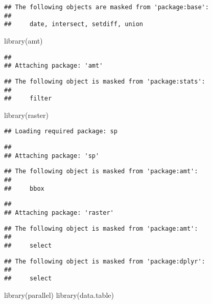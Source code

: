 \documentclass[
]{article}
\newenvironment{Shaded}{\begin{snugshade}}{\end{snugshade}}
\newcommand{\FunctionTok}[1]{\textcolor[rgb]{0.00,0.00,0.00}{#1}}
\newcommand{\NormalTok}[1]{#1}
\begin{document}
\begin{verbatim}
## The following objects are masked from 'package:base':
## 
##     date, intersect, setdiff, union
\end{verbatim}

\begin{Shaded}
\begin{Highlighting}[]
\FunctionTok{library}\NormalTok{(amt)}
\end{Highlighting}
\end{Shaded}

\begin{verbatim}
## 
## Attaching package: 'amt'
\end{verbatim}

\begin{verbatim}
## The following object is masked from 'package:stats':
## 
##     filter
\end{verbatim}

\begin{Shaded}
\begin{Highlighting}[]
\FunctionTok{library}\NormalTok{(raster)}
\end{Highlighting}
\end{Shaded}

\begin{verbatim}
## Loading required package: sp
\end{verbatim}

\begin{verbatim}
## 
## Attaching package: 'sp'
\end{verbatim}

\begin{verbatim}
## The following object is masked from 'package:amt':
## 
##     bbox
\end{verbatim}

\begin{verbatim}
## 
## Attaching package: 'raster'
\end{verbatim}

\begin{verbatim}
## The following object is masked from 'package:amt':
## 
##     select
\end{verbatim}

\begin{verbatim}
## The following object is masked from 'package:dplyr':
## 
##     select
\end{verbatim}

\begin{Shaded}
\begin{Highlighting}[]
\FunctionTok{library}\NormalTok{(parallel)}
\FunctionTok{library}\NormalTok{(data.table)}
\end{Highlighting}
\end{Shaded}
\end{document}
